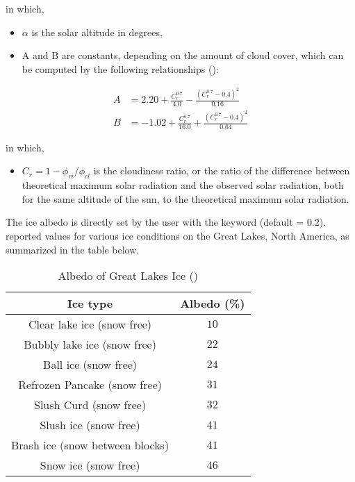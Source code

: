 in which,
\begin{itemize}
   \item $\alpha$ is the solar altitude in degrees,
   \item A and B are constants, depending on the amount of cloud cover,
   which can be computed by the following relationships (\cite{brady1969surface}):
\end{itemize}

\begin{equation} \label{eq:ab}
   \begin{aligned}
     A &= 2.20+\frac{C^{0.7}_r}{4.0}-\frac{(C^{0.7}_r-0.4)^2}{0.16} \\
     B &= -1.02+\frac{C^{0.7}_r}{16.0}+\frac{(C^{0.7}_r-0.4)^2}{0.64}
   \end{aligned}
\end{equation}

in which,
\begin{itemize}
	\item $C_r=1-\phi_{ri}/\phi_{cl}$ is the cloudiness ratio, or the ratio of the difference between theoretical maximum solar radiation and the observed solar radiation, both for the same altitude of the sun, to the theoretical maximum solar radiation.
\end{itemize}

The ice albedo is directly set by the user with the keyword  (default = $0.2$).
\cite{bolsenga1969total} reported values for various ice conditions on the Great Lakes, North America, as summarized in the table below.

\begin{table}[h!]
   \centering
   \caption{Albedo of Great Lakes Ice (\cite{bolsenga1969total})}
   \label{table:albedo}
   \begin{tabular}{ c | c}
      Ice type &  Albedo (\%) \\
      \hline
      Clear lake ice (snow free) & $10$ \\
      Bubbly lake ice (snow free) & $22$ \\
      Ball ice (snow free) & $24$ \\
      Refrozen Pancake (snow free) & $31$ \\
      Slush Curd (snow free) & $32$ \\
      Slush ice (snow free) & $41$ \\
      Brash ice (snow between blocks) & $41$ \\
      Snow ice (snow free) & $46$ \\
   \end{tabular}
\end{table}

